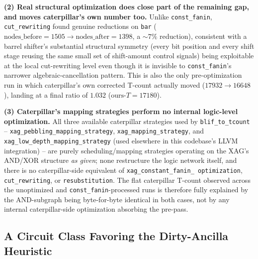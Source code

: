 \textbf{(2) Real structural optimization does close part of the
remaining gap, and moves caterpillar's own number too.} Unlike
\texttt{const\_fanin}, \texttt{cut\_rewriting} found genuine
reductions on \texttt{bar} ($\mathrm{nodes\_before} = 1505 \to
\mathrm{nodes\_after} = 1398$, a $\sim\!7\%$ reduction), consistent
with a barrel shifter's substantial structural symmetry (every bit
position and every shift stage reusing the same small set of
shift-amount control signals) being exploitable at the local
cut-rewriting level even though it is invisible to
\texttt{const\_fanin}'s narrower algebraic-cancellation pattern. This
is also the only pre-optimization run in which caterpillar's own
corrected T-count actually moved ($17932 \to 16648$), landing at a
final ratio of $1.032$ ($\mathrm{ours}\text{-}T = 17180$).

\textbf{(3) Caterpillar's mapping strategies perform no internal
logic-level optimization.} All three available caterpillar
strategies used by \texttt{blif\_to\_tcount} --
\texttt{xag\_pebbling\_mapping\_strategy},
\texttt{xag\_mapping\_strategy}, and
\texttt{xag\_low\_depth\_mapping\_strategy} (used elsewhere in this
codebase's LLVM integration) -- are purely scheduling/mapping
strategies operating on the XAG's AND/XOR structure \emph{as given};
none restructure the logic network itself, and there is no
caterpillar-side equivalent of \texttt{xag\_constant\_fanin\_
optimization}, \texttt{cut\_rewriting}, or \texttt{resubstitution}.
The flat caterpillar T-count observed across the unoptimized and
\texttt{const\_fanin}-processed runs is therefore fully explained by
the AND-subgraph being byte-for-byte identical in both cases, not by
any internal caterpillar-side optimization absorbing the pre-pass.

\subsection{A Circuit Class Favoring the Dirty-Ancilla Heuristic}

